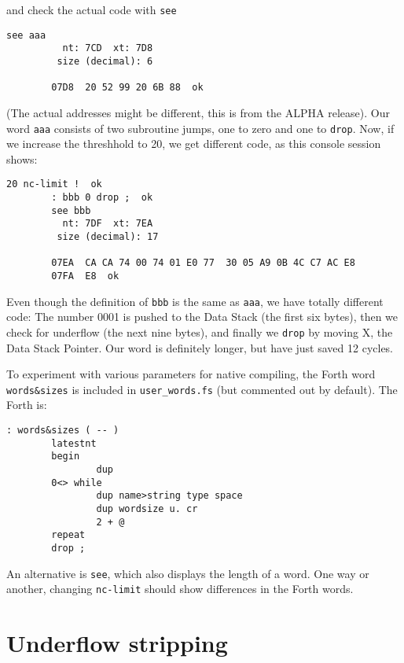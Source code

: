 \noindent and check the actual code with \texttt{see}

\begin{lstlisting}[frame=lines]
        see aaa
          nt: 7CD  xt: 7D8
         size (decimal): 6

        07D8  20 52 99 20 6B 88  ok
\end{lstlisting}

\noindent (The actual addresses might be different, this is from the ALPHA release).  Our
word \texttt{aaa} consists of two subroutine jumps, one to zero and one to
\texttt{drop}. Now, if we increase the threshhold to 20, we get different code,
as this console session shows:

\begin{lstlisting}[frame=lines]
        20 nc-limit !  ok
        : bbb 0 drop ;  ok
        see bbb
          nt: 7DF  xt: 7EA
         size (decimal): 17

        07EA  CA CA 74 00 74 01 E0 77  30 05 A9 0B 4C C7 AC E8
        07FA  E8  ok
\end{lstlisting}

\noindent Even though the definition of \texttt{bbb} is the same as \texttt{aaa}, we have
totally different code: The number 0001 is pushed to the Data Stack (the first
six bytes), then we check for underflow (the next nine bytes),
and finally we \texttt{drop} by moving X, the Data Stack
Pointer. Our word is definitely longer, but have just saved 12 cycles.

To experiment with various parameters for native compiling, the Forth word
\texttt{words\&sizes} is included in \texttt{user\_words.fs} (but commented out 
by default). The Forth is:

\begin{lstlisting}[frame=lines]
: words&sizes ( -- )
        latestnt
        begin
                dup
        0<> while
                dup name>string type space
                dup wordsize u. cr      
                2 + @
        repeat
        drop ;
\end{lstlisting}

\noindent An alternative is \texttt{see}, which also
displays the length of a word. One way or another, changing \texttt{nc-limit}
should show differences in the Forth words.


\section{Underflow stripping}

